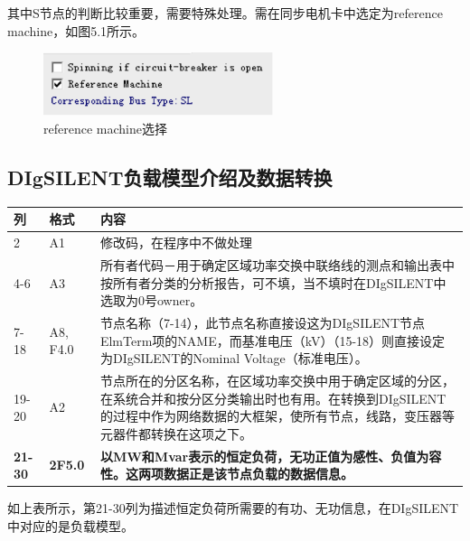 其中S节点的判断比较重要，需要特殊处理。需在同步电机卡中选定为reference machine，如图5.1所示。

\begin{figure}[H]
\centering
\includegraphics[width=0.6\textwidth]{images/Paper_Fig_18.png}
\setcaptionwidth{\linewidth}
\caption{reference machine选择}
\end{figure}

\subsection{DIgSILENT负载模型介绍及数据转换}

\begin{spacing}{1.0}
\begin{longtable}[h]{llp{}}
\toprule
列 & 格式 & 内容\\
 \midrule
2 & A1 & 修改码，在程序中不做处理\\
4-6 & A3 & 所有者代码－用于确定区域功率交换中联络线的测点和输出表中按所有者分类的分析报告，可不填，当不填时在DIgSILENT中选取为0号owner。 \\ 
7-18 & A8, F4.0 & 节点名称（7-14），此节点名称直接设这为DIgSILENT节点ElmTerm项的NAME，而基准电压（kV）（15-18）则直接设定为DIgSILENT的Nominal Voltage（标准电压）。\\
19-20 & A2 & 节点所在的分区名称，在区域功率交换中用于确定区域的分区，在系统合并和按分区分类输出时也有用。在转换到DIgSILENT的过程中作为网络数据的大框架，使所有节点，线路，变压器等元器件都转换在这项之下。\\
\textbf{21-30} & \textbf{2F5.0} & \textbf{以MW和Mvar表示的恒定负荷，无功正值为感性、负值为容性。这两项数据正是该节点负载的数据信息。}\\
\bottomrule
\end{longtable}
\end{spacing}

如上表所示，第21-30列为描述恒定负荷所需要的有功、无功信息，在DIgSILENT中对应的是负载模型。


